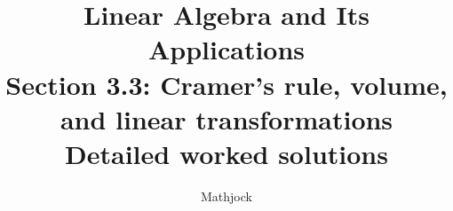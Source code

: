 
\title{\textbf{Linear Algebra and Its Applications}\\[0.3em]Section 3.3: Cramer's rule, volume, and linear transformations\\[0.3em]\large Detailed worked solutions}
\author{Mathjock}
\date{}

\maketitle
\bookinfo
\tableofcontents
\clearpage
\renewcommand{\thesection}{3.\arabic{section}}
\renewcommand{\theHsection}{3.\arabic{section}}
\setcounter{section}{2}


